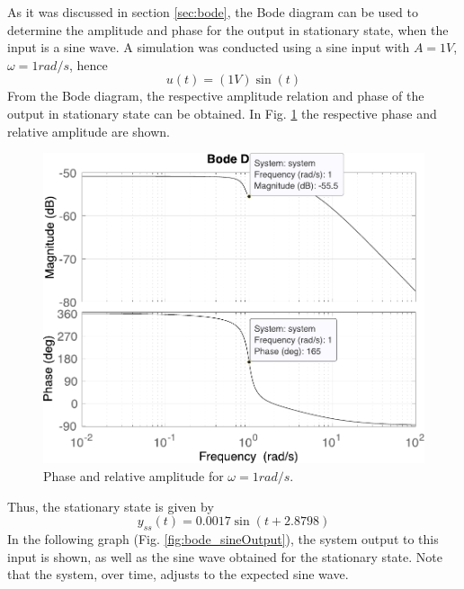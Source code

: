 As it was discussed in section \ref{sec:bode}, the Bode diagram can be used to determine the amplitude and phase for the output in stationary state, when the input is a sine wave. A simulation was conducted using a sine input with $A=1V$, $\omega=1rad/s$, hence
\begin{equation}\label{eq:inputFrequency}
    u(t)=(1V)\sin(t)
\end{equation}
From the Bode diagram, the respective amplitude relation and phase of the output in stationary state can be obtained. In Fig. \ref{fig:bodePoints} the respective phase and relative amplitude are shown. 
\begin{figure}[H]
    \centering
    \includegraphics[scale=0.5]{figs/sineOutput/bodePointsW_1.pdf}
    \caption{Phase and relative amplitude for $\omega=1rad/s$.}
    \label{fig:bodePoints}
\end{figure}
Thus, the stationary state is given by
\begin{equation} \label{eq:sine_ss}
    y_{ss}(t)=0.0017\sin(t + 2.8798)
\end{equation}
In the following graph (Fig. \ref{fig:bode_sineOutput}), the system output to this input is shown, as well as the sine wave obtained for the stationary state. Note that the system, over time, adjusts to the expected sine wave.

